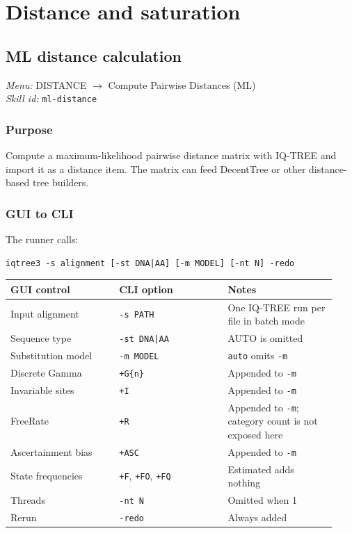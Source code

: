 \documentclass[11pt]{report}
\begin{document}
\chapter{Distance and saturation}
\section{ML distance calculation}
\noindent\textit{Menu:} DISTANCE $\rightarrow$ Compute Pairwise Distances (ML)\\
\noindent\textit{Skill id:} \texttt{ml-distance}

\subsection{Purpose}

Compute a maximum-likelihood pairwise distance matrix with IQ-TREE and import it as a distance item. The matrix can feed DecentTree or other distance-based tree builders.

\subsection{GUI to CLI}

The runner calls:

\begin{lstlisting}
iqtree3 -s alignment [-st DNA|AA] [-m MODEL] [-nt N] -redo
\end{lstlisting}

{\footnotesize
\begin{longtable}{@{}>{\raggedright\arraybackslash}p{0.31\linewidth}>{\raggedright\arraybackslash}p{0.31\linewidth}>{\raggedright\arraybackslash}p{0.31\linewidth}@{}}
\toprule
GUI control & CLI option & Notes \\
\midrule
\endhead
Input alignment & \texttt{-s PATH} & One IQ-TREE run per file in batch mode \\
Sequence type & \texttt{-st DNA|\allowbreak AA} & AUTO is omitted \\
Substitution model & \texttt{-m MODEL} & \texttt{auto} omits \texttt{-m} \\
Discrete Gamma & \texttt{+G\{n\}} & Appended to \texttt{-m} \\
Invariable sites & \texttt{+I} & Appended to \texttt{-m} \\
FreeRate & \texttt{+R} & Appended to \texttt{-m}; category count is not exposed here \\
Ascertainment bias & \texttt{+ASC} & Appended to \texttt{-m} \\
State frequencies & \texttt{+F}, \texttt{+FO}, \texttt{+FQ} & Estimated adds nothing \\
Threads & \texttt{-nt N} & Omitted when 1 \\
Rerun & \texttt{-redo} & Always added \\
\bottomrule
\end{longtable}
}
\end{document}
